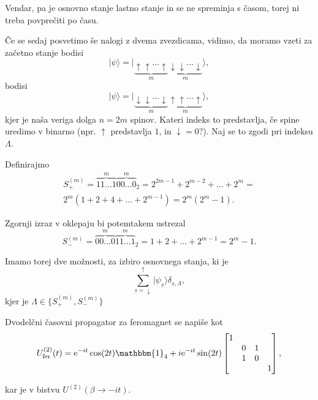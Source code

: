 \documentclass[12pt, a4 paper]{article}
\newcommand{\e}{
	\ensuremath{\mathrm{e}}
}
\begin{document}
Vendar, pa je osnovno stanje lastno stanje in se ne spreminja s \v casom, torej ni treba povpre\v citi po \v casu.

\v Ce se sedaj posvetimo \v se nalogi z dvema zvezdicama, vidimo, da moramo vzeti za za\v cetno stanje bodisi
\[
	|\psi\rangle = |\underbrace{\uparrow\uparrow\ldots\uparrow}_{m}\underbrace{\downarrow\downarrow\ldots\downarrow}_{m}
		\rangle,
\]
bodisi
\[
	|\psi\rangle = |\underbrace{\downarrow\downarrow\ldots\downarrow}_{m}\underbrace{\uparrow\uparrow\ldots\uparrow}_{m}
		\rangle,
\]
kjer je na\v sa veriga dolga $n = 2m$ spinov. Kateri indeks to predstavlja, \v ce spine uredimo v binarno (npr. $\uparrow$
predstavlja $1$, in $\downarrow = 0$?). Naj se to zgodi pri indeksu $\Lambda$.

Definirajmo
\begin{multline}
	S_+^{(m)} = \overbrace{11\ldots1}^{m}\overbrace{00\ldots0}^{m}{}_2 = 2^{2m-1} + 2^{m-2} + \ldots + 2^m = \\
		2^m(1 + 2 + 4 + \ldots + 2^{m-1}) = 2^m (2^m - 1).
\end{multline}

Zgornji izraz v oklepaju bi potemtakem ustrezal
\begin{equation}
	S_-^{(m)} = \overbrace{00\ldots0}^{m}\overbrace{11\ldots1}^{m}{}_2 = 1 + 2 + \ldots + 2^{m-1} = 2^m-1.
\end{equation}

Imamo torej dve mo\v znosti, za izbiro osnovnega stanja, ki je
\[
	\sum_{\underline{s} = \downarrow}^{\uparrow} |\psi_{\underline{s}}\rangle \delta_{\underline{s}, \Lambda},
\]
kjer je $\Lambda \in \{S^{(m)}_+, S^{(m)}_-\}$

Dvodel\v cni \v casovni propagator za feromagnet se napi\v se kot
\[
	U^{(2)}_\text{fer}(t) = \e^{-it}\cos(2t)\mathbbm{1}_4 + i\e^{-it}\sin(2t) \begin{bmatrix}
		1 &  &  &  \\
		 & 0 & 1 &  \\
		 & 1 & 0 &  \\
		 &  &  & 1 \end{bmatrix},
\]

kar je v bistvu $U^{(2)}(\beta \to -it)$.
\end{document}
